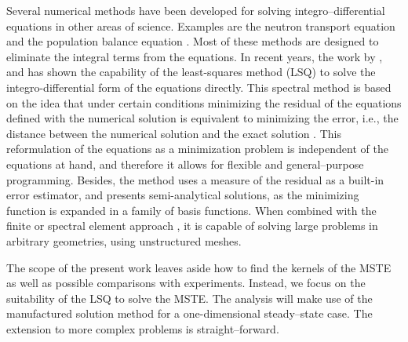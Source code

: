 \documentclass{CFD2011}
\newcommand{\newf}[1]{#1}
\newcommand{\nof}[1]{\textcolor{cyan}{}}
\begin{document}

\newf{Several numerical methods have been developed for solving integro--differential equations in other areas of science. Examples are the neutron transport equation \cite{Duderstadt1976} and the population balance equation \cite{Ramkrishna2000}. Most of these methods are designed to eliminate the integral terms from the equations.}
\newf{In recent years, the work by \cite{Dorao05a}, \cite{Patruno2010} and \cite{Sporleder2011} has shown the capability of the least-squares method (LSQ) to solve the integro-differential form of the equations directly. This spectral method is based on the idea that under certain conditions minimizing the residual of the equations defined with the numerical solution is equivalent to minimizing the error, i.e., the distance between the numerical solution and the exact solution \cite{Jiang1998}. This reformulation of the equations as a minimization problem is independent of the equations at hand, and therefore it allows for flexible and general--purpose programming. Besides, the method uses a measure of the residual as a built-in error estimator, and presents semi-analytical solutions, as the minimizing function is expanded in a family of basis functions. When combined with the finite or spectral element approach \cite{Gerritsma2010}, it is capable of solving large problems in arbitrary geometries, using unstructured meshes.}

The scope of the present work \nof{does not allow us to address}\newf{leaves aside} how to find \nof{any of }the kernels of the MSTE \nof{nor any comparison}\newf{as well as possible comparisons} with experiments. \nof{We are interested in the study of the suitability of the LSQ method for the solution of the MSTE for porous media, and this will be achieved by the manufactured solution method. We will only focus here in the steady state case, in one dimension only.}\newf{Instead, we focus on the suitability of the LSQ to solve the MSTE. The analysis will make use of the manufactured solution method for a one-dimensional steady--state case. The extension to more complex problems is straight--forward.}
\end{document}
